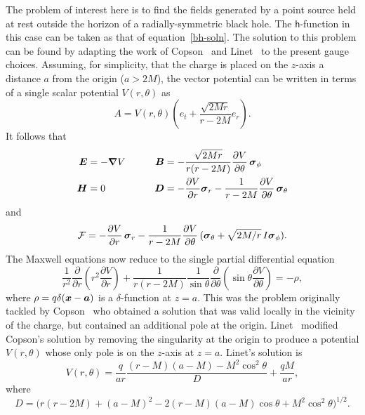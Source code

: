 \documentclass[a4paper]{article}
\numberwithin{equation}{section}
\newcommand{\sig}{\mbox{\boldmath $\sigma$}}
\newcommand{\ba}{\mbox{\boldmath $a$}}
\newcommand{\bx}{\mbox{\boldmath $x$}}
\newcommand{\bB}{\mbox{\boldmath $B$}}
\newcommand{\bD}{\mbox{\boldmath $D$}}
\newcommand{\bE}{\mbox{\boldmath $E$}}
\newcommand{\bH}{\mbox{\boldmath $H$}}
\newcommand{\bsig}{\mbox{\boldmath $\sig$}}
\newcommand{\clf}{{\mathcal{F}}}
\newcommand{\sigr}{\bsig_r}
\newcommand{\sigth}{\bsig_\theta}
\newcommand{\sigph}{\bsig_\phi}
\newcommand{\lih}{\mathsf{h}}
\newcommand{\grad}{\nabla}
\newcommand{\bgrad}{\mbox{\boldmath $\grad$}}
\newcommand{\deriv}[2]{\frac{\partial #1}{\partial #2}}
\begin{document}
The problem of interest here is to find the fields generated by a
point source held at rest outside the horizon of a radially-symmetric
black hole.  The $\lih$-function in this case can be taken as that of
equation~\eqref{bh-soln}.  The solution to this problem can be found by
adapting the work of Copson~\cite{cop28} and Linet~\cite{lin76} to the
present gauge choices.  Assuming, for simplicity, that the charge is
placed on the $z$-axis a distance $a$ from the origin ($a>2M$), the
vector potential can be written in terms of a single scalar potential
$V(r,\theta)$ as
%
\begin{equation}
A = V(r,\theta) \left( e_t + \frac{\sqrt{2Mr}}{r-2M} e_r \right).
\end{equation}
%
It follows that
%
\begin{alignat}{2}
\bE &= - \bgrad V & \qquad \bB &= -  \frac{\sqrt{2Mr}}{r(r-2M)}
\deriv{V}{\theta} \, \sigph \\
\bH &= 0 & \qquad \bD &= - \deriv{V}{r} \sigr - \frac{1}{r-2M}
\deriv{V}{\theta} \, \sigth 
\end{alignat}
%
and
%
\begin{equation}
\clf = -\deriv{V}{r} \, \sigr - \frac{1}{r-2M} \deriv{V}{\theta} \,
(\sigth + \sqrt{2M/r} \, I\sigph  ). \label{max-F} 
\end{equation} 
%
The Maxwell equations now reduce to the single partial differential
equation
%
\begin{equation}
\frac{1}{r^2} \deriv{}{r} \left( r^2 \deriv{V}{r} \right) +
\frac{1}{r(r-2M)} \frac{1}{\sin\! \theta} \deriv{}{\theta} \left( \sin\!
\theta \deriv{V}{\theta} \right) = - \rho,
\end{equation}
%
where $\rho= q\delta(\bx-\ba)$ is a $\delta$-function at $z=a$.  This
was the problem originally tackled by Copson~\cite{cop28} who obtained
a solution that was valid locally in the vicinity of the charge, but
contained an additional pole at the origin.  Linet~\cite{lin76}
modified Copson's solution by removing the singularity at the origin
to produce a potential $V(r,\theta)$ whose only pole is on the
$z$-axis at $z=a$.  Linet's solution is
%
\begin{equation}
V(r,\theta) = \frac{q}{ar} \frac{(r-M)(a-M) - M^2 \cos^2\!\theta}{D} +
\frac{qM}{ar},
\label{max-V}
\end{equation}
%
where
%
\begin{equation}
D = \bigl( r(r-2M) + (a-M)^2 -2(r-M)(a-M) \cos\!\theta + M^2
\cos^2\!\theta \bigr)^{1/2} .
\end{equation}
%
\end{document}
